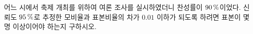 어느 시에서 축제 개최를 위하여 여론 조사를 실시하였더니 찬성률이 $90\mkern3mu \%$이었다. 신뢰도 $95\mkern3mu \%$로 추정한 모비율과 표본비율의 차가 $0.01$ 이하가 되도록 하려면 표본이 몇 명 이상이어야 하는지 구하시오. 

